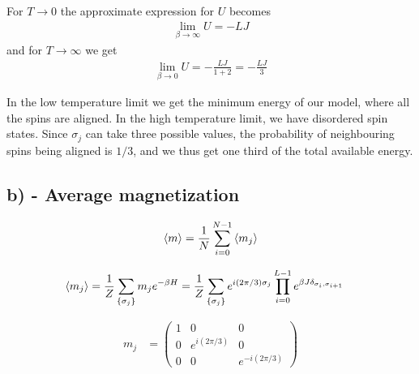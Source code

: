 \documentclass[reprint,english,notitlepage,aps,nobalancelastpage,nofootinbib]{revtex4-1}
\newcommand{\sumstate}{\sum_{\{\sigma_j\}}}
\newcommand{\prodstate}{\prod_{i=0}^{L-1}}
\newcommand{\mj}{m_j}
\begin{document}
For $T\to0$ the approximate expression for $U$ becomes 
\begin{align*}
	\lim_{\beta\to\infty} U = -LJ
\end{align*}
and for $T\to\infty$ we get 
\begin{align*}
	\lim_{\beta\to0} U = -\frac{LJ}{1+2}=-\frac{LJ}{3}
\end{align*}

In the low temperature limit we get the minimum energy of our model, where all the spins are aligned. In the high temperature limit, we have disordered spin states. Since $\sigma_j$ can take three possible values, the probability of neighbouring spins being aligned is $1/3$, and we thus get one third of the total available energy.  


\subsection*{b) - Average magnetization}

\begin{align*}
	\expval{m} = \frac{1}{N} \sum_{i=0}^{N-1}\expval{m_j}
\end{align*}


\begin{align*}
	\expval{m_j} &= \frac{1}{Z} \sumstate \mj e^{-\beta H} = \frac{1}{Z} \sumstate e^{i(2\pi/3)\sigma_j} \prodstate e^{\beta J \delta_{\sigma_i,\sigma_{i+1}}}
\end{align*}

\begin{align*}
	\mj &= \begin{pmatrix}
		1 & 0 & 0 \\
		0 & e^{i(2\pi/3)} & 0 \\ 
		0 & 0 & e^{-i(2\pi/3)}
	\end{pmatrix}
\end{align*}
\end{document}
